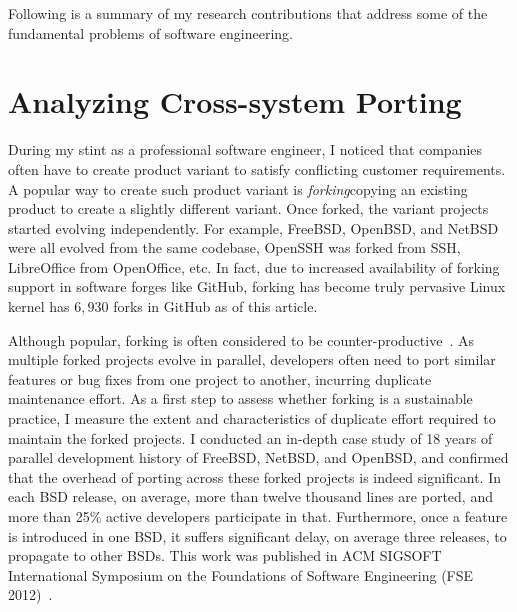 \documentclass[a4paper, 11pt]{article}
\begin{document}
\begin{small}
Following is a summary of my research contributions that address some of the fundamental
problems of software engineering.

\section*{Analyzing Cross-system Porting}

During my stint as a professional software engineer, I noticed that companies often have to
create product variant to satisfy conflicting customer requirements. A popular way to create
such product variant is {\em forking}\textemdash copying an existing product to create a
slightly different variant. Once forked, the variant projects started evolving independently.
For example, FreeBSD, OpenBSD, and NetBSD were all evolved from the same codebase, OpenSSH was
forked from SSH,  LibreOffice from OpenOffice, etc.  In fact, due to increased availability of
forking support in software forges like GitHub, forking has become truly pervasive\textemdash
Linux kernel has $6,930$ forks in GitHub as of this article. 

Although popular, forking is often considered to be counter-productive~\cite{Raymond1999:CB}.
As multiple forked projects evolve in parallel, developers often need to port similar features
or bug fixes from one project to another, incurring duplicate maintenance effort. As a first
step to assess whether forking is a sustainable practice, I measure the extent and
characteristics of duplicate effort required to maintain the forked projects. I conducted an
in-depth case study of 18 years of parallel development history of FreeBSD, NetBSD, and
OpenBSD, and confirmed that the overhead of porting across these forked projects
is indeed significant. In each BSD release, on average, more than twelve thousand lines are
ported,  and more than 25\% active developers participate in that.  Furthermore, once a feature
is introduced in one BSD, it suffers significant delay, on average three releases, to propagate
to other BSDs.  
This work was published in ACM SIGSOFT International Symposium on the Foundations
of Software Engineering (FSE 2012)~\cite{Ray2012}. 


\end{small}
\end{document}
